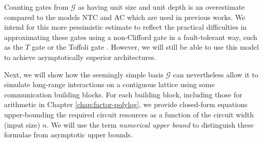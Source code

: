 Counting gates from $\mathcal{G}$ as having unit size and unit depth
is
an overestimate compared to the models \textsf{NTC} and \textsf{AC} which are
used in previous works.
We intend
for this more pessimistic estimate to reflect the practical difficulties
in approximating these gates using a non-Clifford gate in a fault-tolerant way,
such as the $T$ gate or the Toffoli gate
\cite{Fowler2011}.
However, we will still be able to use this model to achieve asymptotically
superior architectures.

Next, we will show how the
seemingly simple basis $\mathcal{G}$ can nevertheless allow it to simulate
long-range interactions on a contiguous lattice using some
communication building blocks.
For each building block, including those for arithmetic in
Chapter \ref{chap:factor-polylog},
we provide closed-form equations upper-bounding the required circuit
resources as a function of the circuit width (input size) $n$.
We will use the
term \emph{numerical upper bound} to distinguish these formulae from asymptotic
upper bounds.